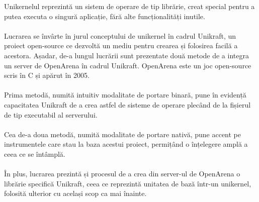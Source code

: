 \documentclass{thesis.cs.pub.ro}
\begin{document}


\begin{frontmatter} %






\printabbrev

\begin{sinopsis}
Unikernelul reprezintă un sistem de operare de tip librărie, creat special pentru a putea executa o singură aplicație, fără alte funcționalități inutile. \\ \\
Lucrarea se învârte în jurul conceptului de unikernel în cadrul Unikraft, un proiect open-source ce dezvoltă un mediu pentru crearea și folosirea facilă a acestora.
Așadar, de-a lungul lucrării sunt prezentate două metode de a integra un server de OpenArena în cadrul Unikraft. OpenArena este un joc open-source scris în C și apărut în 2005. \\ \\
Prima metodă, numită intuitiv modalitate de portare binară, pune în evidență capacitatea Unikraft de a crea astfel de sisteme de operare plecând de la fișierul de tip executabil al serverului. \\ \\
    Cea de-a doua metodă, numită modalitate de portare nativă, pune accent pe instrumentele care stau la baza acestui proiect, permițând o înțelegere amplă a ceea ce se întâmplă. \\ \\
În plus, lucrarea prezintă și procesul de a crea din server-ul de OpenArena o librărie specifică Unikraft, ceea ce reprezintă unitatea de bază într-un unikernel, folosită ulterior cu același scop ca mai înainte.
\end{sinopsis}


\end{frontmatter}
\end{document}
